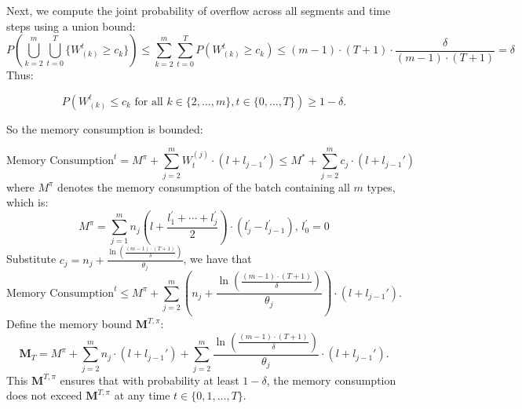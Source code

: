 Next, we compute the joint probability of overflow across all segments and time steps using a union bound:
\[ P\left( \bigcup_{k=2}^m \bigcup_{t=0}^T \{ W^t_{(k)} \geq c_k \} \right) \leq \sum_{k=2}^m \sum_{t=0}^T P\left( W^t_{(k)} \geq c_k \right)\leq (m - 1) \cdot (T + 1) \cdot \frac{\delta}{(m - 1) \cdot (T + 1)} = \delta \]
Thus:

\[ P\left( W^t_{(k)} \leq c_k \text{ for all } k \in \{2, \dots, m\}, t \in \{0, \dots, T\} \right) \geq 1 - \delta. \]

So the memory consumption is bounded:

\[ \text{Memory Consumption}^t = M^\pi + \sum_{j=2}^m W_t^{(j)} \cdot (l + l_{j-1}')\leq M^* + \sum_{j=2}^m c_j \cdot (l + l_{j-1}') \]
where $M^\pi$ denotes the memory consumption of the batch containing all $m$ types, which is:
$$M^\pi = \sum_{j=1}^m  n_j \left( l+ \frac{l_1^\prime+\cdots+l_j^\prime}{2} \right)\cdot \left( l_j^\prime - l_{j-1}^\prime \right) ,\, l_0^\prime = 0 $$
Substitute \(c_j = n_j + \frac{\ln\left( \frac{(m - 1) \cdot (T + 1)}{\delta} \right)}{\theta_j} \), we have that
\[ \text{Memory Consumption}^t \leq M^\pi + \sum_{j=2}^m \left( n_j + \frac{\ln\left( \frac{(m - 1) \cdot (T + 1)}{\delta} \right)}{\theta_j} \right) \cdot (l + l_{j-1}'). \]
Define the memory bound \( \mathbf{M}^{T,\pi} \):
\[ \mathbf{M}_T = M^\pi + \sum_{j=2}^m n_j \cdot (l + l_{j-1}') + \sum_{j=2}^m \frac{\ln\left( \frac{(m - 1) \cdot (T + 1)}{\delta} \right)}{\theta_j} \cdot (l + l_{j-1}'). \]
This \( \mathbf{M}^{T,\pi} \) ensures that with probability at least \( 1 - \delta \), the memory consumption does not exceed \( \mathbf{M}^{T,\pi} \) at any time \( t \in \{0, 1, \dots, T\} \).



